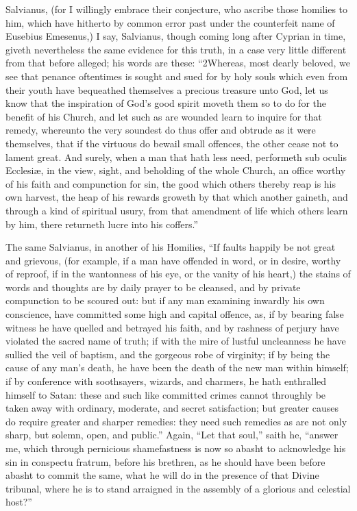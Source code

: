 Salvianus, (for I willingly embrace their conjecture, who ascribe those homilies to him, which have hitherto by common error past under the counterfeit name of Eusebius Emesenus,) I say, Salvianus, though coming long after Cyprian in time, giveth nevertheless the same evidence for this truth, in a case very little different from that before alleged; his words are these: “2Whereas, most dearly beloved, we see that penance oftentimes is sought and sued for by holy souls which even from their youth have bequeathed themselves a precious treasure unto God, let us know that the inspiration of God’s good spirit moveth them so to do for the benefit of his Church, and let such as are wounded learn to inquire for that remedy, whereunto the very soundest do thus offer and obtrude as it were themselves, that if the virtuous do bewail small offences, the other cease not to lament great. And surely, when a man that hath less need, performeth sub oculis Ecclesiæ, in the view, sight, and beholding of the whole Church, an office worthy of his faith and compunction for sin, the good which others thereby reap is his own harvest, the heap of his rewards groweth by that which another gaineth, and through a kind of spiritual usury, from that amendment of life which others learn by him, there returneth lucre into his coffers.”

The same Salvianus, in another of his Homilies, “If faults happily be not great and grievous, (for example, if a man have offended in word, or in desire, worthy of reproof, if in the wantonness of his eye, or the vanity of his heart,) the stains of words and thoughts are by daily prayer to be cleansed, and by private compunction to be scoured out: but if any man examining inwardly his own conscience, have committed some high and capital offence, as, if by bearing false witness he have quelled and betrayed his faith, and by rashness of perjury have violated the sacred name of truth; if with the mire of lustful uncleanness he have sullied the veil of baptism, and the gorgeous robe of virginity; if by being the cause of any man’s death, he have been the death of the new man within himself; if by conference with soothsayers, wizards, and charmers, he hath enthralled himself to Satan: these and such like committed crimes cannot throughly be taken away with ordinary, moderate, and secret satisfaction; but greater causes do require greater and sharper remedies: they need such remedies as are not only sharp, but solemn, open, and public.” Again, “Let that soul,” saith he, “answer me, which through pernicious shamefastness is now so abasht to acknowledge his sin in conspectu fratrum, before his brethren, as he should have been before abasht to commit the same, what he will do in the presence of that Divine tribunal, where he is to stand arraigned in the assembly of a glorious and celestial host?”

